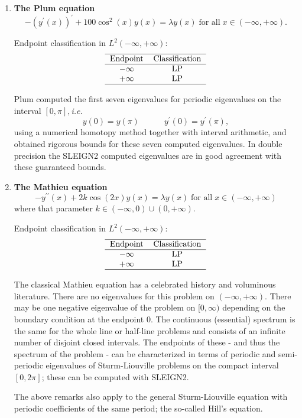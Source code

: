 \documentclass[12pt]{amsart}%
\theoremstyle{plain}
\numberwithin{equation}{section}
\begin{document}
\begin{enumerate}
\item \textbf{The Plum equation}%
\[
-(y^{\prime}(x))^{\prime}+100\cos^{2}(x)y(x)=\lambda y(x)\;\text{for
all}\;x\in(-\infty,+\infty).
\]

Endpoint classification in $L^{2}(-\infty,+\infty)$:%
\[%
\begin{tabular}
[c]{cc}\hline
Endpoint & Classification\\\hline
$-\infty$ & LP\\
$+\infty$ & LP\\\hline
\end{tabular}
\]

Plum \cite{P} computed the first seven eigenvalues for periodic eigenvalues on
the interval $[0,\pi],$\textit{i.e.}%
\[
y(0)=y(\pi)\quad\quad\quad y^{\prime}(0)=y^{\prime}(\pi),
\]
using a numerical homotopy method together with interval arithmetic, and
obtained rigorous bounds for these seven computed eigenvalues. In double
precision the SLEIGN2 computed eigenvalues are in good agreement with these
guaranteed bounds.

\item \textbf{The Mathieu equation}%
\[
-y^{\prime\prime}(x)+2k\cos(2x)y(x)=\lambda y(x)\;\text{for all}\;x\in
(-\infty,+\infty)
\]
where that parameter $k\in(-\infty,0)\cup(0,+\infty).$

Endpoint classification in $L^{2}(-\infty,+\infty)$:%
\[%
\begin{tabular}
[c]{cc}\hline
Endpoint & Classification\\\hline
$-\infty$ & LP\\
$+\infty$ & LP\\\hline
\end{tabular}
\]

The classical Mathieu equation has a celebrated history and voluminous
literature. There are no eigenvalues for this problem on $(-\infty,+\infty)$.
There may be one negative eigenvalue of the problem on $[0,\infty)$ depending
on the boundary condition at the endpoint $0$. The continuous (essential)
spectrum is the same for the whole line or half-line problems and consists of
an infinite number of disjoint closed intervals. The endpoints of these - and
thus the spectrum of the problem - can be characterized in terms of periodic
and semi-periodic eigenvalues of Sturm-Liouville problems on the compact
interval $[0,2\pi]$; these can be computed with SLEIGN2.

The above remarks also apply to the general Sturm-Liouville equation with
periodic coefficients of the same period; the so-called Hill's equation.


\end{enumerate}
\end{document}
